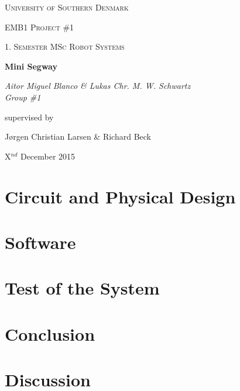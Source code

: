 \documentclass[12pt,a4paper]{article}
\begin{document}
\begin{titlepage}
	\centering
	\vfill
	{\scshape\LARGE University of Southern Denmark\par}
	\vspace{1cm}
	{\scshape\Large EMB1 Project \#1\par}
	{\scshape\large 1. Semester MSc Robot Systems\par}
	\vspace{1.5cm}
	{\huge\bfseries Mini Segway\par}
	\vspace{2cm}
	{\Large\itshape Aitor Miguel Blanco \& Lukas Chr. M. W. Schwartz \\ Group \#1 \par}
	\vfill
	supervised by\par
	J\o rgen Christian Larsen \& Richard Beck

	\vspace{2cm}

	{\large X$^{nd}$ December 2015 \par}
\end{titlepage}

\pagebreak


\pagebreak


\tableofcontents

\pagebreak

\listoffigures

\listoftables

\pagebreak



\pagebreak


\section{Circuit and Physical Design}






\pagebreak
\section{Software}








\pagebreak
\section{Test of the System}


\pagebreak
\section{Conclusion}


\pagebreak
\section{Discussion}


\pagebreak
\appendix
\end{document}
